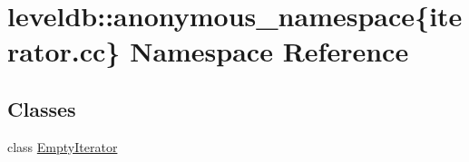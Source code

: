 \hypertarget{namespaceleveldb_1_1anonymous__namespace_02iterator_8cc_03}{}\section{leveldb\+:\+:anonymous\+\_\+namespace\{iterator.\+cc\} Namespace Reference}
\label{namespaceleveldb_1_1anonymous__namespace_02iterator_8cc_03}
\subsection*{Classes}
\begin{DoxyCompactItemize}
\item 
class \hyperlink{classleveldb_1_1anonymous__namespace_02iterator_8cc_03_1_1_empty_iterator}{Empty\+Iterator}
\end{DoxyCompactItemize}
